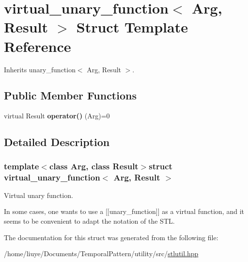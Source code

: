 \hypertarget{structvirtual__unary__function}{}\section{virtual\+\_\+unary\+\_\+function$<$ Arg, Result $>$ Struct Template Reference}
\label{structvirtual__unary__function}


Inherits unary\+\_\+function$<$ Arg, Result $>$.

\subsection*{Public Member Functions}
\begin{DoxyCompactItemize}
\item 
\hypertarget{structvirtual__unary__function_aef31e06f8708dc3e9c05024c4cbd70c1}{}virtual Result {\bfseries operator()} (Arg)=0\label{structvirtual__unary__function_aef31e06f8708dc3e9c05024c4cbd70c1}

\end{DoxyCompactItemize}


\subsection{Detailed Description}
\subsubsection*{template$<$class Arg, class Result$>$struct virtual\+\_\+unary\+\_\+function$<$ Arg, Result $>$}

Virtual unary function.

In some cases, one wants to use a \mbox{[}\mbox{[}unary\+\_\+function\mbox{]}\mbox{]} as a virtual function, and it seems to be convenient to adapt the notation of the S\+T\+L. 

The documentation for this struct was generated from the following file\+:\begin{DoxyCompactItemize}
\item 
/home/liuye/\+Documents/\+Temporal\+Pattern/utility/src/\hyperlink{stlutil_8hpp}{stlutil.\+hpp}\end{DoxyCompactItemize}
